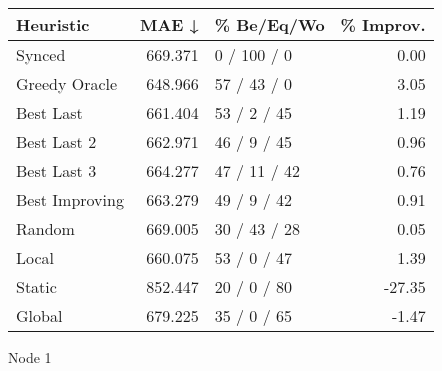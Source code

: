 \begin{tabular}{lrlr}
\toprule
\textbf{Heuristic} & \textbf{MAE ↓} & \textbf{\% Be/Eq/Wo} & \textbf{\% Improv.} \\
\midrule
            Synced &        669.371 &          0 / 100 / 0 &                0.00 \\
     Greedy Oracle &        648.966 &          57 / 43 / 0 &                3.05 \\
         Best Last &        661.404 &          53 / 2 / 45 &                1.19 \\
       Best Last 2 &        662.971 &          46 / 9 / 45 &                0.96 \\
       Best Last 3 &        664.277 &         47 / 11 / 42 &                0.76 \\
    Best Improving &        663.279 &          49 / 9 / 42 &                0.91 \\
            Random &        669.005 &         30 / 43 / 28 &                0.05 \\
             Local &        660.075 &          53 / 0 / 47 &                1.39 \\
            Static &        852.447 &          20 / 0 / 80 &              -27.35 \\
            Global &        679.225 &          35 / 0 / 65 &               -1.47 \\
\bottomrule
\end{tabular}
\caption{Node 1}
\label{tab:non_lr05_le2_bs2_1}
